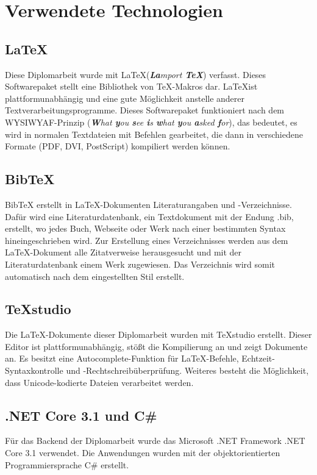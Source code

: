 \chapter{Verwendete Technologien} \label{technologien}

\section{\LaTeX}
Diese Diplomarbeit wurde mit \LaTeX \space (\textit{{\bf{\textit{La}}}mport {\bf{\textit{\TeX}}}}) verfasst. Dieses Softwarepaket stellt eine Bibliothek von \TeX-Makros dar. \LaTeX \space ist plattformunabhängig und eine gute Möglichkeit anstelle anderer Textverarbeitungsprogramme. Dieses Softwarepaket funktioniert nach dem WYSIWYAF-Prinzip (\textit{{\bf{W}}hat {\bf{y}}ou {\bf{s}}ee {\bf{i}}s {\bf{w}}hat {\bf{y}}ou {\bf{a}}sked {\bf{f}}or}), das bedeutet, es wird in normalen Textdateien mit Befehlen gearbeitet, die dann in verschiedene Formate (PDF, DVI, PostScript) kompiliert werden können. \autocite{wikiLatex}

\section{BibTeX}
BibTeX erstellt in \LaTeX-Dokumenten Literaturangaben und -Verzeichnisse. Dafür wird eine Literaturdatenbank, ein Textdokument mit der Endung .bib, erstellt, wo jedes Buch, Webseite oder Werk nach einer bestimmten Syntax hineingeschrieben wird. Zur Erstellung eines Verzeichnisses werden aus dem \LaTeX-Dokument alle Zitatverweise herausgesucht und mit der Literaturdatenbank einem Werk zugewiesen. Das Verzeichnis wird somit automatisch nach dem eingestellten Stil erstellt. \autocite{wikiBibtex}

\section{TeXstudio}
Die \LaTeX-Dokumente dieser Diplomarbeit wurden mit TeXstudio erstellt. Dieser Editor ist plattformunabhängig, stößt die Kompilierung an und zeigt Dokumente an. Es besitzt eine Autocomplete-Funktion für \LaTeX-Befehle, Echtzeit-Syntaxkontrolle und -Rechtschreibüberprüfung. Weiteres besteht die Möglichkeit, dass Unicode-kodierte Dateien verarbeitet werden. \autocite{wikiTexstudio}

\newpage

\section{.NET Core 3.1 und C\#}
Für das Backend der Diplomarbeit wurde das Microsoft .NET Framework .NET Core 3.1 verwendet. Die Anwendungen wurden mit der objektorientierten Programmiersprache C\#  erstellt. \autocite{wikiDotnet}

